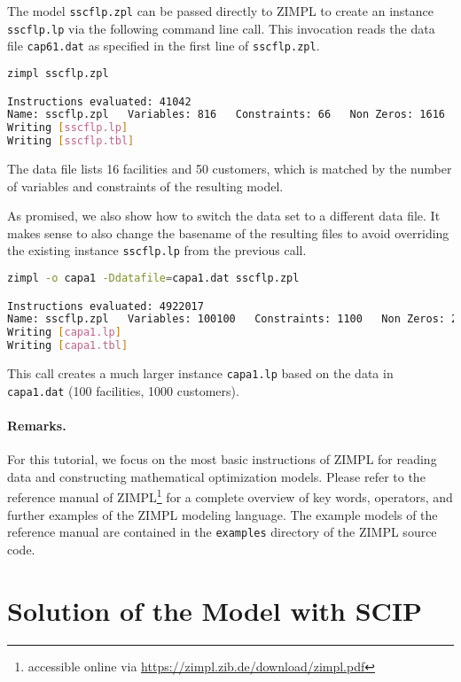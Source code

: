 \documentclass[a4paper,10pt]{article}
\begin{document}
The model \texttt{sscflp.zpl} can be passed directly to ZIMPL to create an instance \texttt{sscflp.lp} via the following command line call.
This invocation reads the data file \texttt{cap61.dat} as specified in
the first line of \texttt{sscflp.zpl}.

\begin{lstlisting}[language=bash,caption=ZIMPL command line invokation]
zimpl sscflp.zpl

Instructions evaluated: 41042
Name: sscflp.zpl   Variables: 816   Constraints: 66   Non Zeros: 1616
Writing [sscflp.lp]
Writing [sscflp.tbl]
\end{lstlisting}

The data file lists 16 facilities and 50 customers, which is matched by the number of variables and constraints of the resulting model.
%

As promised, we also show how to switch the data set to a different data file.
%
It makes sense to also change the basename of the resulting files to avoid overriding the existing instance \texttt{sscflp.lp} from the previous call.

\begin{lstlisting}[language=bash,caption=ZIMPL command line invokation with options]
zimpl -o capa1 -Ddatafile=capa1.dat sscflp.zpl

Instructions evaluated: 4922017
Name: sscflp.zpl   Variables: 100100   Constraints: 1100   Non Zeros: 200100
Writing [capa1.lp]
Writing [capa1.tbl]
\end{lstlisting}

This call creates a much larger instance \texttt{capa1.lp} based on the data in \texttt{capa1.dat} (100 facilities, 1000 customers).


\paragraph{Remarks.}

For this tutorial, we focus on the most basic instructions of ZIMPL for reading data and constructing mathematical optimization models.
Please refer to the reference manual of ZIMPL\footnote{accessible online via \url{https://zimpl.zib.de/download/zimpl.pdf}} for a complete overview of key words, operators, and further examples of the ZIMPL modeling language.
The example models of the reference manual are contained in the \texttt{examples} directory of the ZIMPL source code.


\section{Solution of the Model with SCIP}
\end{document}

